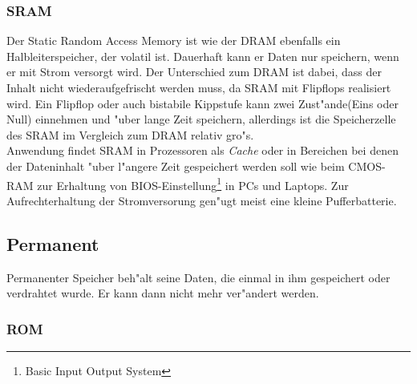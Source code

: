 				\subsubsection{SRAM}
				\label{ch:Technisch:sec:Elektronische Speicherung:sub:Fl"uchtig:subsub:SRAM}
				
					Der \glqq Static Random Access Memory\grqq{} ist wie der DRAM ebenfalls ein Halbleiterspeicher, der volatil ist. Dauerhaft kann er Daten nur speichern, wenn er mit Strom versorgt wird. Der Unterschied zum DRAM ist dabei, dass der Inhalt nicht wiederaufgefrischt werden muss, da SRAM mit Flipflops realisiert wird. Ein Flipflop oder auch bistabile Kippstufe kann zwei Zust"ande(Eins oder Null) einnehmen und "uber lange Zeit speichern, allerdings ist die Speicherzelle des SRAM im Vergleich zum DRAM relativ gro"s.
					\\
					Anwendung findet SRAM in Prozessoren als \textit{Cache} oder in Bereichen bei denen der Dateninhalt "uber l"angere Zeit gespeichert werden soll wie beim CMOS-RAM zur Erhaltung von BIOS-Einstellung\footnote{Basic Input Output System} in PCs und Laptops. Zur Aufrechterhaltung der Stromversorung gen"ugt meist eine kleine Pufferbatterie.
					
        
        \subsection{Permanent}
        \label{ch:Technisch:sec:Elektronische Speicherung:sub:Permanent}
        
            Permanenter Speicher beh"alt seine Daten, die einmal in ihm gespeichert oder verdrahtet wurde. Er kann dann nicht mehr ver"andert werden.
			
				\subsubsection{ROM}
				\label{ch:Technisch:sec:Elektronische Speicherung:sub:Fl"uchtig:subsub:ROM}
				
